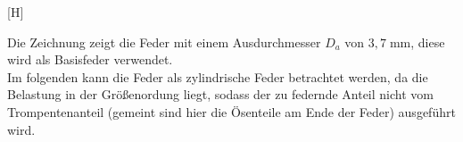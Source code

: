 \begin{center}[H]
\end{center}
Die Zeichnung zeigt die Feder mit einem Ausdurchmesser $D_a$ von $3,7\;\text{mm}$, diese wird
als Basisfeder verwendet.\\ 

Im folgenden kann die Feder als zylindrische Feder betrachtet werden,
da die Belastung in der Größenordung liegt, sodass der zu federnde Anteil nicht 
vom Trompentenanteil (gemeint sind hier die Ösenteile am Ende der Feder)
ausgeführt wird.
